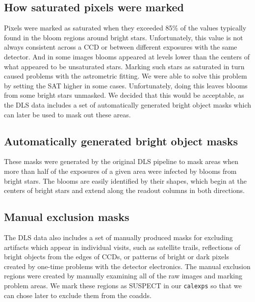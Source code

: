 \documentclass[modern]{aastex61}
\begin{document}
\subsection{How saturated pixels were marked}
Pixels were marked as saturated when they exceeded 85\% of the values typically found in the bloom regions around bright stars. Unfortunately, this value is not always consistent across a CCD or between different exposures with the same detector. And in some images blooms appeared at levels lower than the centers of what appeared to be unsaturated stars. Marking such stars as saturated in turn caused problems with the astrometric fitting.
We were able to solve this problem by setting the SAT higher in some cases. Unfortunately, doing this leaves blooms from some bright stars unmasked. We decided that this would be acceptable, as the DLS data includes a set of automatically generated bright object masks which can later be used to mask out these areas.

\subsection{Automatically generated bright object masks}
These masks were generated by the original DLS pipeline to mask areas when more than half of the exposures of a given area were infected by blooms from bright stars. The blooms are easily identified by their shapes, which begin at the centers of bright stars and extend along the readout columns in both directions.

\subsection{Manual exclusion masks}
The DLS data also includes a set of manually produced masks for excluding artifacts which appear in individual visits, such as satellite trails, reflections of bright objects from the edges of CCDs, or patterns of bright or dark pixels created by one-time problems with the detector electronics. The manual exclusion regions were created by manually examining all of the raw images and marking problem areas.
We mark these regions as SUSPECT in our {\tt\string calexps} so that we can chose later to exclude them from the coadds.
\end{document}
